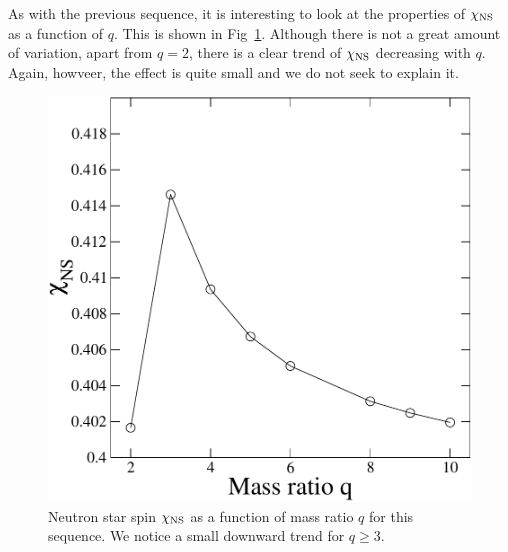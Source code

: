 As with the previous sequence, it is interesting to look at the
properties of $\chi_{\rm NS}$ as a function of $q$. This is shown in
Fig~\ref{fig:qchi}. Although there is not a great amount of variation,
apart from $q=2$, there is a clear trend of
$\chi_{\rm NS}$ decreasing with $q$. Again, howveer, the effect is quite small and we do not seek to explain it.
\begin{figure}
\includegraphics[width=0.95\columnwidth]{chap4/qchi}
\caption[$\chi_{\rm NS}$ as a function of mass ratio
$q$.]{\label{fig:qchi}Neutron star spin $\chi_{\rm
    NS}$ as a function of mass ratio $q$ for this sequence. We notice
  a small downward trend for $q \geq 3$.}
\end{figure}




